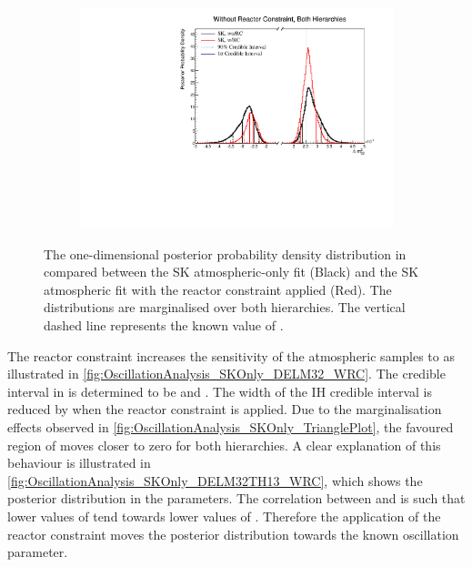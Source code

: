 \begin{figure}[h]
  \begin{subfigure}[t]{0.98\textwidth}
    \includegraphics[width=\textwidth, trim={0mm 0mm 0mm 0mm}, clip,page=1]{Figures/OA/SKOnlyFit_wRC/ContourComparison_1D_dm32_BH_2_wRC_woRC_UnSmeared_CredibleInterval.pdf}
  \end{subfigure}
  \caption{The one-dimensional posterior probability density distribution in  compared between the SK atmospheric-only fit (Black) and the SK atmospheric fit with the reactor constraint applied (Red). The distributions are marginalised over both hierarchies. The vertical dashed line represents the known value of .}
  \label{fig:OscillationAnalysis_SKOnly_DELM32_WRC}
\end{figure}

The reactor constraint increases the sensitivity of the atmospheric samples to  as illustrated in \autoref{fig:OscillationAnalysis_SKOnly_DELM32_WRC}. The \quickmath{1\sigma} credible interval in  is determined to be  and . The width of the IH credible interval is reduced by  when the reactor constraint is applied. Due to the marginalisation effects observed in \autoref{fig:OscillationAnalysis_SKOnly_TrianglePlot}, the favoured region of  moves closer to zero for both hierarchies. A clear explanation of this behaviour is illustrated in \autoref{fig:OscillationAnalysis_SKOnly_DELM32TH13_WRC}, which shows the posterior distribution in the  parameters. The correlation between  and  is such that lower values of  tend towards lower values of . Therefore the application of the reactor constraint moves the posterior distribution towards the known oscillation parameter.

